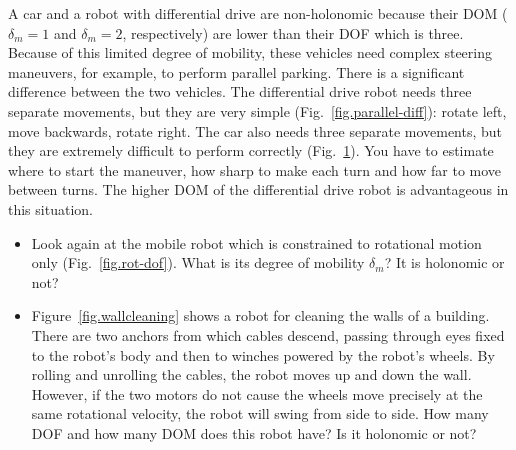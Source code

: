 A car and a robot with differential drive are non-holonomic because their DOM ($\delta_m=1$ and $\delta_m=2$, respectively) are lower than their DOF which is three. Because of this limited degree of mobility, these vehicles need complex steering maneuvers, for example, to perform parallel parking. There is a significant difference between the two vehicles. The differential drive robot needs three separate movements, but they are very simple (Fig.~\ref{fig.parallel-diff}): rotate left, move backwards, rotate right. The car also needs three separate movements, but they are extremely difficult to perform correctly (Fig.~\ref{fig.parallel-car}). You have to estimate where to start the maneuver, how sharp to make each turn and how far to move between turns. The higher DOM of the differential drive robot is advantageous in this situation.

\begin{figure}
\subfigures
{}
\hspace{\fill}
\label{fig.parallel-diff}
\label{fig.parallel-car}
\end{figure}

\begin{framed}
\begin{itemize}
\item Look again at the mobile robot which is constrained to rotational motion only (Fig.~\ref{fig.rot-dof}). What is its degree of mobility $\delta_m$? It is holonomic or not?
\item Figure~\ref{fig.wallcleaning} shows a robot for cleaning the walls of a building. There are two anchors from which cables descend, passing through eyes fixed to the robot's body and then to winches powered by the robot's wheels. By rolling and unrolling the cables, the robot moves up and down the wall. However, if the two motors do not cause the wheels move precisely at the same rotational velocity, the robot will swing from side to side. How many DOF and how many DOM does this robot have? Is it holonomic or not?
\end{itemize}
\end{framed}


